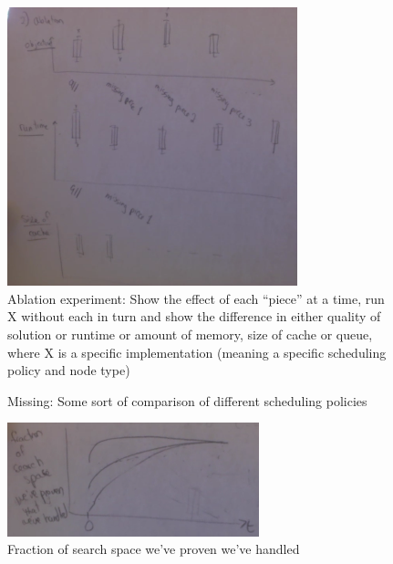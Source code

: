 \begin{figure}[t!]
\begin{center}
\includegraphics[width=0.75\textwidth]{figs/sketch-ablation.png}
\end{center}
\caption{Ablation experiment:
Show the effect of each ``piece'' at a time,
run X without each in turn and show the difference in either
quality of solution or runtime or amount of memory, size of cache or queue,
where X is a specific implementation
(meaning a specific scheduling policy and node type)}
\label{fig:ablation}
\end{figure}

\begin{figure}[t!]
\begin{center}
\end{center}
\caption{Missing:  Some sort of comparison of different scheduling policies}
\label{fig:scheduling-policy}
\end{figure}

\begin{figure}[t!]
\begin{center}
\includegraphics[width=0.65\textwidth]{figs/sketch-search-space.png}
\end{center}
\caption{Fraction of search space we've proven we've handled}
\label{fig:search-space}
\end{figure}

